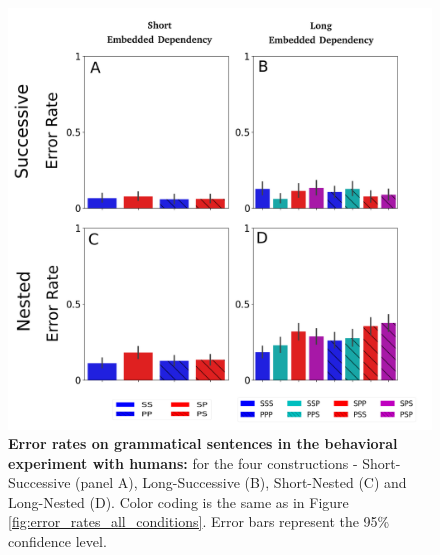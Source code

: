 \begin{figure}[t]
    \centering
    \includegraphics[width=\linewidth]{figures/SM/error_rates_acceptable_all_conditions.png}
    \caption{\textbf{Error rates on grammatical sentences in the behavioral experiment with humans:} for the four constructions - Short-Successive (panel A), Long-Successive (B), Short-Nested (C) and Long-Nested (D). Color coding is the same as in Figure \ref{fig:error_rates_all_conditions}. Error bars represent the 95\% confidence level.}
    \label{fig:error_rates_acceptable}
\end{figure}

% 



% 


